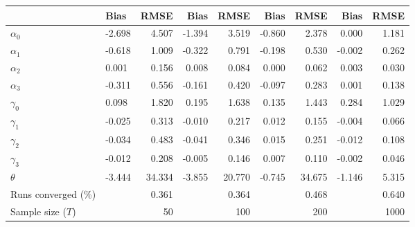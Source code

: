 
\begin{tabular}[t]{llrrrrrrr}
\toprule
  & Bias & RMSE & Bias & RMSE & Bias & RMSE & Bias & RMSE\\
\midrule
$\alpha_{0}$ & -2.698 & 4.507 & -1.394 & 3.519 & -0.860 & 2.378 & 0.000 & 1.181\\
$\alpha_{1}$ & -0.618 & 1.009 & -0.322 & 0.791 & -0.198 & 0.530 & -0.002 & 0.262\\
$\alpha_{2}$ & 0.001 & 0.156 & 0.008 & 0.084 & 0.000 & 0.062 & 0.003 & 0.030\\
$\alpha_{3}$ & -0.311 & 0.556 & -0.161 & 0.420 & -0.097 & 0.283 & 0.001 & 0.138\\
$\gamma_{0}$ & 0.098 & 1.820 & 0.195 & 1.638 & 0.135 & 1.443 & 0.284 & 1.029\\
$\gamma_{1}$ & -0.025 & 0.313 & -0.010 & 0.217 & 0.012 & 0.155 & -0.004 & 0.066\\
$\gamma_{2}$ & -0.034 & 0.483 & -0.041 & 0.346 & 0.015 & 0.251 & -0.012 & 0.108\\
$\gamma_{3}$ & -0.012 & 0.208 & -0.005 & 0.146 & 0.007 & 0.110 & -0.002 & 0.046\\
$\theta$ & -3.444 & 34.334 & -3.855 & 20.770 & -0.745 & 34.675 & -1.146 & 5.315\\
Runs converged (\%) &  & 0.361 &  & 0.364 &  & 0.468 &  & 0.640\\
Sample size ($T$) &  & 50 &  & 100 &  & 200 &  & 1000\\
\bottomrule
\end{tabular}
